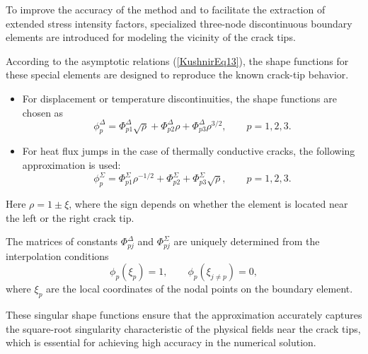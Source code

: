 To improve the accuracy of the method and to facilitate the extraction
of extended stress intensity factors, specialized three-node discontinuous
boundary elements are introduced for modeling the vicinity of the crack
tips.

According to the asymptotic relations (\ref{KushnirEq13}), the shape
functions for these special elements are designed to reproduce the
known crack-tip behavior.

\begin{itemize}
	
	\item For displacement or temperature discontinuities, the shape
	functions are chosen as
	\begin{equation}
		\phi_{p}^{\Delta}
		=
		\Phi_{p1}^{\Delta}\sqrt{\rho}
		+
		\Phi_{p2}^{\Delta}\rho
		+
		\Phi_{p3}^{\Delta}\rho^{3/2},
		\qquad p=1,2,3.
		\label{KushnirEq24}
	\end{equation}
	
	\item For heat flux jumps in the case of thermally conductive cracks,
	the following approximation is used:
	\begin{equation}
		\phi_{p}^{\Sigma}
		=
		\Phi_{p1}^{\Sigma}\rho^{-1/2}
		+
		\Phi_{p2}^{\Sigma}
		+
		\Phi_{p3}^{\Sigma}\sqrt{\rho},
		\qquad p=1,2,3.
		\label{KushnirEq25}
	\end{equation}
	
\end{itemize}
%
Here $\rho=1\pm\xi$, where the sign depends on whether the element
is located near the left or the right crack tip.

The matrices of constants $\Phi_{pj}^{\Delta}$ and $\Phi_{pj}^{\Sigma}$
are uniquely determined from the interpolation conditions
\begin{equation}
	\phi_{p}(\xi_{p})=1,
	\qquad
	\phi_{p}(\xi_{j\ne p})=0,
	\label{KushnirEq26}
\end{equation}
where $\xi_{p}$ are the local coordinates of the nodal points on the
boundary element.

These singular shape functions ensure that the approximation accurately
captures the square-root singularity characteristic of the physical
fields near the crack tips, which is essential for achieving high
accuracy in the numerical solution.

